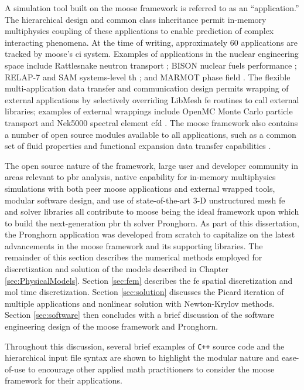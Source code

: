 A simulation tool built on the \gls{moose} framework is referred to as an ``application.'' The hierarchical design and common class inheritance permit in-memory multiphysics coupling of these applications to enable prediction of complex interacting phenomena. At the time of writing, approximately 60 applications are tracked by \gls{moose}'s \gls{ci} system. Examples of applications in the nuclear engineering space include Rattlesnake neutron transport \cite{rattlesnake}; BISON nuclear fuels performance \cite{bison}; RELAP-7 and SAM systems-level \gls{th} \cite{relap7,hu}; and MARMOT phase field \cite{tonks}. The flexible multi-application data transfer and communication design permits wrapping of external applications by selectively overriding LibMesh \gls{fe} routines to call external libraries; examples of external wrappings include OpenMC Monte Carlo particle transport and Nek5000 spectral element \gls{cfd} \cite{romano, NEK5000, novak}. The \gls{moose} framework also contains a number of open source modules available to all applications, such as a common set of fluid properties and functional expansion data transfer capabilities \cite{wendt}. 

The open source nature of the framework, large user and developer community in areas relevant to \gls{pbr} analysis, native capability for in-memory multiphysics simulations with both peer \gls{moose} applications and external wrapped tools, modular software design, and use of state-of-the-art 3-D unstructured mesh \gls{fe} and solver libraries all contribute to \gls{moose} being the ideal framework upon which to build the next-generation \gls{pbr} \gls{th} solver Pronghorn. As part of this dissertation, the Pronghorn application was developed from scratch to capitalize on the latest advancements in the \gls{moose} framework and its supporting libraries. The remainder of this section describes the numerical methods employed for discretization and solution of the models described in Chapter \ref{sec:PhysicalModels}. Section \ref{sec:fem} describes the \gls{fe} spatial discretization and \gls{mol} time discretization. Section \ref{sec:solution} discusses the Picard iteration of multiple applications and nonlinear solution with Newton-Krylov methods. Section \ref{sec:software} then concludes with a brief discussion of the software engineering design of the \gls{moose} framework and Pronghorn.

Throughout this discussion, several brief examples of \texttt{C++} source code and the hierarchical input file syntax are shown to highlight the modular nature and ease-of-use to encourage other applied math practitioners to consider the \gls{moose} framework for their applications. 


